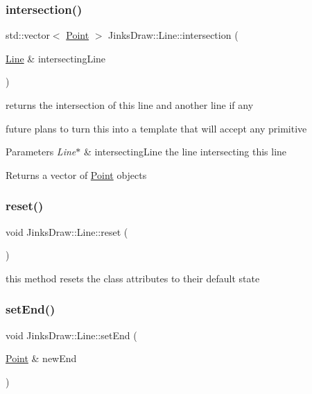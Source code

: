 \subsubsection{\texorpdfstring{intersection()}{intersection()}}
{\footnotesize\ttfamily std\+::vector$<$ \mbox{\hyperlink{class_jinks_draw_1_1_point}{Point}} $>$ Jinks\+Draw\+::\+Line\+::intersection (\begin{DoxyParamCaption}\item[{\mbox{\hyperlink{class_jinks_draw_1_1_line}{Line}} \&}]{intersecting\+Line }\end{DoxyParamCaption})}



returns the intersection of this line and another line if any 

future plans to turn this into a template that will accept any primitive 
\begin{DoxyParams}{Parameters}
{\em Line$\ast$} & intersecting\+Line the line intersecting this line \\
\hline
\end{DoxyParams}
\begin{DoxyReturn}{Returns}
a vector of \mbox{\hyperlink{class_jinks_draw_1_1_point}{Point}} objects 
\end{DoxyReturn}
\mbox{\label{class_jinks_draw_1_1_line_a95823711fb1ebc27435aff387c42b577}} 
\subsubsection{\texorpdfstring{reset()}{reset()}}
{\footnotesize\ttfamily void Jinks\+Draw\+::\+Line\+::reset (\begin{DoxyParamCaption}{ }\end{DoxyParamCaption})}



this method resets the class attributes to their default state 

\mbox{\label{class_jinks_draw_1_1_line_affea1d620e660a388d30808ac9404457}} 
\subsubsection{\texorpdfstring{set\+End()}{setEnd()}}
{\footnotesize\ttfamily void Jinks\+Draw\+::\+Line\+::set\+End (\begin{DoxyParamCaption}\item[{\mbox{\hyperlink{class_jinks_draw_1_1_point}{Point}} \&}]{new\+End }\end{DoxyParamCaption})}




